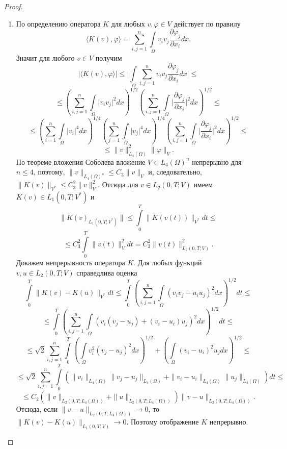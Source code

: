 \begin{proof}
\begin{enumerate}
        \item По определению оператора $K$ для любых $v,\varphi\in V$ действует по правилу
        $$\langle K(v),\varphi \rangle = \sum_{i,j=1}^{n}\int\limits_\Omega v_i v_j \frac{\partial \varphi_j}{\partial x_i}dx.$$
        Значит для любого $v\in V$ получим
        $$\bigg|\langle K(v),\varphi \rangle\bigg|\le\bigg|\int\limits_{\Omega}\sum_{i,j=1}^{n}v_i v_j \frac{\partial \varphi_j}{\partial x_i}dx\bigg|\le$$
        $$\le(\sum_{i,j=1}^{n}\int\limits_{\Omega}\bigg|v_i v_j\bigg|^2 dx)^{1/2}(\sum_{i,j=1}^{n}\int\limits_{\Omega}\bigg|\frac{\partial \varphi_j}{\partial x_i}\bigg|^2 dx)^{1/2}\le$$
        $$\le(\sum_{i=1}^{n}\int\limits_{\Omega}\bigg|v_i\bigg|^4 dx)^{1/4}(\sum_{j=1}^{n}\int\limits_{\Omega}\bigg|v_j\bigg|^4 dx)^{1/4}
        (\sum_{i,j=1}^{n}\int\limits_{\Omega}\bigg|\frac{\partial \varphi_j}{\partial x_i}\bigg|^2 dx)^{1/2}\le$$
        $$\le\|v\|^2_{L_4(\Omega)}\|\varphi\|_V.$$
        По теореме вложения Соболева вложение $V\in L_4(\Omega)^n$ непрерывно для $n\le 4$, поэтому, $\|v\|_{L_4(\Omega)^n}\le C_3\|v\|_V$ и, следовательно,
        $\|K(v)\|_{V^*}\le C_3^2\|v\|^2_V.$ Отсюда для $v\in L_2(0,T;V)$ имеем $K(v)\in L_1(0,T;V^*)$ и
        $$\|K(v)_{L_1(0,T;V^*)}\|\le\int\limits_0^T\|K(v(t))\|_{V^*} dt \le$$
        $$\le C_3^2\int\limits_0^T\|v(t)\|_V^2 dt=C_3^2\|v(t)\|_{L_2(0,T;V)}^2.$$
        Докажем непрерывность оператора $K$. Для любых функций\linebreak
        $v,u\in L_2(0,T;V)$ справедлива оценка
        $$\int\limits_0^T\|K(v)-K(u)\|_{V^*} dt\le\int\limits_0^T(\sum_{i,j=1}^{n}\int\limits_\Omega (v_iv_j-u_iu_j)^2dx)^{1/2} dt\le$$
        $$\le\int\limits_0^T(\sum_{i,j=1}^{n}\int\limits_\Omega (v_i(v_j-u_j)+(v_i-u_i)u_j)^2dx)^{1/2}dt\le$$
        $$\le\sqrt2\sum_{i,j=1}^{n}\int\limits_0^T (\int\limits_{\Omega}v^2_i(v_j-u_j)^2dx)^{1/2}+
        (\int\limits_{\Omega}(v_i-u_i)^2u_j dx)^{1/2}\le$$
        $$\le\sqrt2\sum_{i,j=1}^{n}\int\limits_0^T(\|v_i\|_{L_4(\Omega)}\|v_j-u_j\|_{L_4(\Omega)}
        +\|v_i-u_i\|_{L_4(\Omega)}\|u_j\|_{L_4(\Omega)})dt\le$$
        $$\le C_2(\|v\|_{L_2(0,T;L_4(\Omega))}+\|u\|_{L_2(0,T;L_4(\Omega))})\|v-u\|_{L_2(0,T;L_4(\Omega))}.$$
        Отсюда, если $\|v-u\|_{L_2(0,T;L_4(\Omega))}\rightarrow 0$, то $\|K(v)-K(u)\|_{L_1(0,T;V)}\rightarrow 0$. Поэтому отображение $K$ непрерывно.
    \end{enumerate}
\end{proof}

